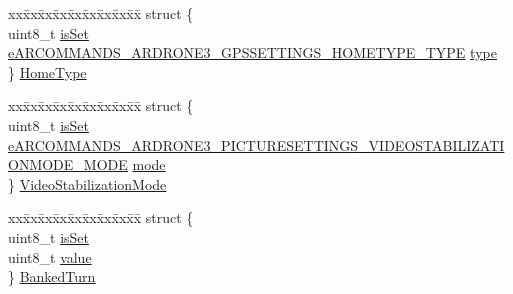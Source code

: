 \begin{DoxyCompactItemize}
\begin{tabbing}
\end{tabbing}\item 
\begin{tabbing}
xx\=xx\=xx\=xx\=xx\=xx\=xx\=xx\=xx\=\kill
struct \{\\
\>uint8\_t \hyperlink{struct_a_r_c_o_m_m_a_n_d_s___generic___drone_settings__t_a4f2f0ff81459692aadd142afdaed16b8}{isSet}\\
\>\hyperlink{_a_r_c_o_m_m_a_n_d_s___types_8h_a3a5e8521f5021194a32328f7a5dd53dd}{eARCOMMANDS\_ARDRONE3\_GPSSETTINGS\_HOMETYPE\_TYPE} \hyperlink{struct_a_r_c_o_m_m_a_n_d_s___generic___drone_settings__t_a6c2f47b6cb349eff2ad580f1846bc290}{type}\\
\} \hyperlink{struct_a_r_c_o_m_m_a_n_d_s___generic___drone_settings__t_acde1d29b8d10444f433617f1291827a3}{HomeType}\\

\end{tabbing}\item 
\begin{tabbing}
xx\=xx\=xx\=xx\=xx\=xx\=xx\=xx\=xx\=\kill
struct \{\\
\>uint8\_t \hyperlink{struct_a_r_c_o_m_m_a_n_d_s___generic___drone_settings__t_a4f2f0ff81459692aadd142afdaed16b8}{isSet}\\
\>\hyperlink{_a_r_c_o_m_m_a_n_d_s___types_8h_a5f86cf2ea9e9b131601057faad9a017d}{eARCOMMANDS\_ARDRONE3\_PICTURESETTINGS\_VIDEOSTABILIZATIONMODE\_MODE} \hyperlink{struct_a_r_c_o_m_m_a_n_d_s___generic___drone_settings__t_a6335c03e5062cb65d350ba1ec75cfd8c}{mode}\\
\} \hyperlink{struct_a_r_c_o_m_m_a_n_d_s___generic___drone_settings__t_aef0afc8ce1214955ba8b7f589b3d21cf}{VideoStabilizationMode}\\

\end{tabbing}\item 
\begin{tabbing}
xx\=xx\=xx\=xx\=xx\=xx\=xx\=xx\=xx\=\kill
struct \{\\
\>uint8\_t \hyperlink{struct_a_r_c_o_m_m_a_n_d_s___generic___drone_settings__t_a4f2f0ff81459692aadd142afdaed16b8}{isSet}\\
\>uint8\_t \hyperlink{struct_a_r_c_o_m_m_a_n_d_s___generic___drone_settings__t_a0a9323ff5ffcd916428bc1b1dc93b2e7}{value}\\
\} \hyperlink{struct_a_r_c_o_m_m_a_n_d_s___generic___drone_settings__t_a84887814f97ac22da890d362cb5761d8}{BankedTurn}\\

\end{tabbing}\end{DoxyCompactItemize}


